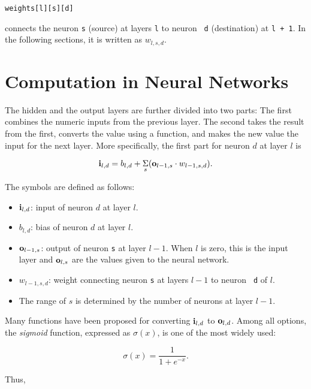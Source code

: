 \begin{verbatim}
weights[l][s][d]
\end{verbatim}

connects the neuron {\tt s} (source) at layers {\tt l} to neuron {\tt
d} (destination) at {\tt l + 1}.  In the following sections, it is
written as $w_{l, s, d}$.

\section{Computation in Neural Networks}

The hidden and the output layers are further divided into two parts:
The first combines the numeric inputs from the previous layer. The
second takes the result from the first, converts the value using a
function, and makes the new value the input for the next layer.  More
specifically, the first part for neuron $d$ at layer $l$ is

\begin{equation}
\mathscr {\bf i}_{l, d} = 
b_{l, d} + \underset{s} {\Sigma}
(\mathscr {\bf o}_{l-1, s}
\cdot
w_{l-1, s, d}).
\end{equation}

The symbols are defined as follows:
\begin{itemize}[noitemsep,nolistsep]
\item $\mathscr {\bf i}_{l, d}$:  input of neuron $d$ at layer $l$.
\item $b_{l,d}$:  bias of neuron $d$ at layer $l$.
\item $\mathscr {\bf o}_{l-1, s}$: output of neuron {\tt s} at layer $l-1$.
When $l$ is zero, this is the input layer and $\mathscr {\bf o}_{l,
s}$ are the values given to the neural network.
\item $w_{l-1, s, d}$:  weight connecting neuron {\tt s} at layers $l-1$ to neuron {\tt
d} of $l$.
\item The range of $s$ is determined by the number of neurons at layer $l-1$.
\end{itemize}

Many functions have been proposed for converting $\mathscr {\bf i}_{l,
d}$ to $\mathscr {\bf o}_{l, d}$.  Among all options, the {\it
sigmoid} function,  expressed as $\sigma(x)$, is one of the most widely
used:

\begin{equation}
\sigma(x) = \frac{1}{1 + e^{-x}}.
\end{equation}

Thus,

